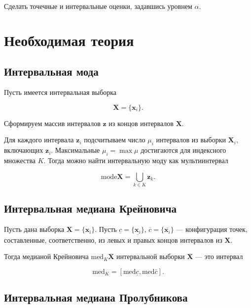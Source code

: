 \documentclass{article}
\begin{document}
  Сделать точечные и интервальные оценки, задавшись уровнем \( \alpha \).

  \section{Необходимая теория}

  \subsection{Интервальная мода}

  Пусть имеется интервальная выборка

  \[
    \mathbf{X} = \{ \mathbf{x}_i \}.
  \]

  Сформируем массив интервалов \( \mathbf{z} \) из концов интервалов
  \( \mathbf{X} \).

  Для каждого интервала \( \mathbf{z}_i \) подсчитываем число \( \mu_i \)
  интервалов из выборки \( \mathbf{X}_i \), включающих \( \mathbf{z}_i \).
  Максимальные \( \mu_i = \max \mu \) достигаются для индексного множества
  \( K \). Тогда можно найти интервальную моду как мультиинтервал

  \begin{equation}
    \text{mode} \mathbf{X} = \bigcup_{k \in K} \mathbf{z}_k.
  \end{equation}

  \subsection{Интервальная медиана Крейновича}

  Пусть дана выборка \( \mathbf{X} = \{ \mathbf{x}_i \} \). Пусть
  \( \underline c = \{ \underline{\mathbf{x}_i} \} \),
  \( \overline c = \{ \overline{\mathbf{x}_i} \} \) --- конфигурация
  точек, составленные, соответственно, из левых и правых концов интервалов
  из \( \mathbf{X} \).

  Тогда медианой Крейновича \( \text{med}_K \mathbf{X} \) интервальной
  выборки \( \mathbf{X} \) --- это интервал

  \begin{equation}
    \text{med}_K = [\text{med} \underline c, \text{med} \overline c].
  \end{equation}

  \subsection{Интервальная медиана Пролубникова}
\end{document}

